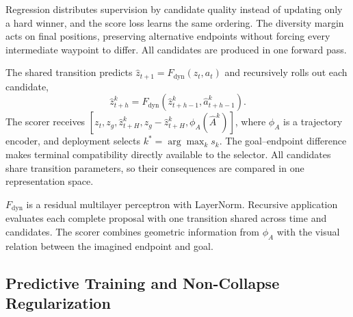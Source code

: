 \documentclass[conference]{IEEEtran}
\begin{document}
Regression distributes supervision by candidate quality instead of updating only a hard winner, and the score loss learns the same ordering. The diversity margin acts on final positions, preserving alternative endpoints without forcing every intermediate waypoint to differ. All candidates are produced in one forward pass.

The shared transition predicts $\hat z_{t+1}=F_{\mathrm{dyn}}(z_t,a_t)$ and recursively rolls out each candidate,
\begin{equation}
\hat z_{t+h}^{k}=F_{\mathrm{dyn}}(\hat z_{t+h-1}^{k},\hat a_{t+h-1}^{k}).
\end{equation}
The scorer receives $[z_t,z_g,\hat z_{t+H}^{k},z_g-\hat z_{t+H}^{k},\phi_A(\hat A^k)]$, where $\phi_A$ is a trajectory encoder, and deployment selects $k^*=\arg\max_k s_k$. The goal--endpoint difference makes terminal compatibility directly available to the selector. All candidates share transition parameters, so their consequences are compared in one representation space.

$F_{\mathrm{dyn}}$ is a residual multilayer perceptron with LayerNorm. Recursive application evaluates each complete proposal with one transition shared across time and candidates. The scorer combines geometric information from $\phi_A$ with the visual relation between the imagined endpoint and goal.

\subsection{Predictive Training and Non-Collapse Regularization}
\end{document}
